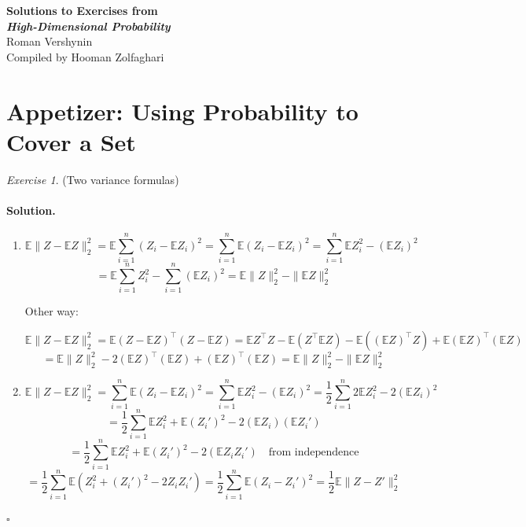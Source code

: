 \documentclass[11pt]{article}
\theoremstyle{definition}
\theoremstyle{remark}
\newtheorem{exercise}{Exercise}[section]
\newenvironment{solution}{\paragraph{Solution.}}{\hfill$\square$\medskip}
\newcommand{\E}{\mathbb{E}}
\newcommand{\1}{\mathbf{1}}
\begin{document}
	
	\begin{center}
		{\Large \textbf{Solutions to Exercises from}}\\[2mm]
		{\Large \textbf{\emph{High-Dimensional Probability}}}\\[2mm]
		{\large Roman Vershynin}\\[4mm]
		{\large Compiled by Hooman Zolfaghari}
	\end{center}
	
\vspace{1cm}

\tableofcontents
\newpage

\section*{Appetizer: Using Probability to Cover a Set}

\begin{exercise}
	(Two variance formulas)
\end{exercise}

\begin{solution}
	\begin{enumerate}
		\item 
		\[
		\E \| Z - \E Z \|_2^2 = \E \sum_{i=1}^{n}( Z_i - \E Z_i )^2 
		=  \sum_{i=1}^{n} \E ( Z_i - \E Z_i )^2 = \sum_{i=1}^{n} \E Z_i^2 - (\E Z_i)^2
		\]
		\[
		= \E \sum_{i=1}^{n} Z_i^2 - \sum_{i=1}^{n}  (\E Z_i)^2 = \E \|Z\|_2^2 - \| \E Z \|_2^2 
		\]
		
		Other way:
		
		\[
		\E \|Z-\E Z\|_2^2 = \E (Z-\E Z)^\top (Z-\E Z) = \E Z^\top Z - \E( Z^\top \E Z )- \E ((\E Z)^\top Z) +\E (\E Z)^\top (\E Z)
		\]
		\[
		= \E\|Z\|_2^2 - 2 (\E Z)^\top (\E Z) + (\E Z)^\top (\E Z) = \E \|Z\|_2^2 - \| \E Z \|_2^2 
		\]
		
		\item 
		
		\[
		\E\|Z - \E Z\|_2^2 = \sum_{i=1}^{n} \E (Z_i - \E Z_i )^2 
		=  \sum_{i=1}^{n} \E Z_i^2 - (\E Z_i)^2 = \frac{1}{2} \sum_{i=1}^{n} 2\E Z_i^2 - 2(\E Z_i)^2 
		\]
		\[
		= \frac{1}{2} \sum_{i=1}^{n} \E Z_i^2 + \E (Z_i')^2 - 2(\E Z_i)(\E Z_i')
		\]
		 \[
		 =  \frac{1}{2} \sum_{i=1}^{n} \E Z_i^2 + \E (Z_i')^2 - 2(\E Z_i Z_i') \quad \text{from independence}
		 \]
		 \[
		 = \frac{1}{2} \sum_{i=1}^{n} \E( Z_i^2 + (Z_i')^2 - 2Z_i Z_i') =  \frac{1}{2} \sum_{i=1}^{n} \E (Z_i - Z_i')^2 = 
		 \frac{1}{2} \E\| Z - Z' \|_2^2
		 \]
		
	\end{enumerate}
	
\end{solution}
\end{document}
